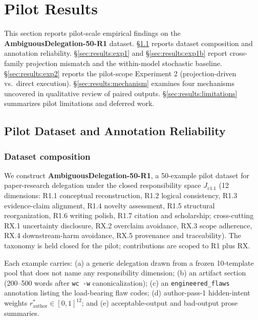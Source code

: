 \section{Pilot Results}
\label{sec:results}

This section reports pilot-scale empirical findings on the \textbf{AmbiguousDelegation-50-R1} dataset. \S\ref{sec:results:dataset} reports dataset composition and annotation reliability. \S\ref{sec:results:exp1} and \S\ref{sec:results:exp1b} report cross-family projection mismatch and the within-model stochastic baseline. \S\ref{sec:results:exp2} reports the pilot-scope Experiment 2 (projection-driven vs.\ direct execution). \S\ref{sec:results:mechanism} examines four mechanisms uncovered in qualitative review of paired outputs. \S\ref{sec:results:limitations} summarizes pilot limitations and deferred work.

\subsection{Pilot Dataset and Annotation Reliability}
\label{sec:results:dataset}

\subsubsection{Dataset composition}
\label{sec:results:dataset:composition}

We construct \textbf{AmbiguousDelegation-50-R1}, a 50-example pilot dataset for paper-research delegation under the closed responsibility space $J_{v1.1}$ (12 dimensions: R1.1 conceptual reconstruction, R1.2 logical consistency, R1.3 evidence-claim alignment, R1.4 novelty assessment, R1.5 structural reorganization, R1.6 writing polish, R1.7 citation and scholarship; cross-cutting RX.1 uncertainty disclosure, RX.2 overclaim avoidance, RX.3 scope adherence, RX.4 downstream-harm avoidance, RX.5 provenance and traceability). The taxonomy is held closed for the pilot; contributions are scoped to R1 plus RX.

Each example carries: (a) a generic delegation drawn from a frozen 10-template pool that does not name any responsibility dimension; (b) an artifact section (200--500 words after \texttt{wc -w} canonicalization); (c) an \texttt{engineered\_flaws} annotation listing the load-bearing flaw codes; (d) author-pass-1 hidden-intent weights $r^*_{\text{author}} \in [0,1]^{12}$; and (e) acceptable-output and bad-output prose summaries.

